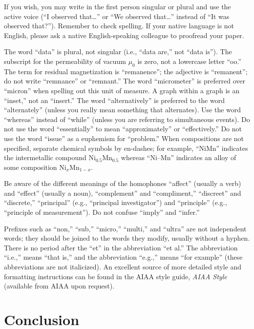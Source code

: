 \documentclass{aiaa-tc}%
\begin{document}
If you wish, you may write in the first person singular or plural and
use the active voice (``I observed that\ldots'' or ``We observed that\ldots''
instead of ``It was observed that?'').
Remember to check spelling.
If your native language is not English, please ask a native
English-speaking colleague to proofread your paper.

The word ``data'' is plural, not singular (i.e., ``data are,'' not ``data
is'').
The subscript for the permeability of vacuum $\mu_0$ is zero, not a
lowercase letter ``oo.''
The term for residual magnetization is ``remanence''; the adjective is
``remanent''; do not write ``remnance'' or ``remnant.''
The word ``micrometer'' is preferred over ``micron'' when spelling out
this unit of measure.
A graph within a graph is an ``inset,'' not an ``insert.''
The word ``alternatively'' is preferred to the word ``alternately''
(unless you really mean something that alternates).
Use the word ``whereas'' instead of ``while'' (unless you are referring
to simultaneous events).
Do not use the word ``essentially'' to mean ``approximately'' or
``effectively.''
Do not use the word ``issue'' as a euphemism for ``problem.''
When compositions are not specified, separate chemical symbols by
en-dashes; for example, ``NiMn'' indicates the intermetallic compound
Ni$_{0.5}$Mn$_{0.5}$ whereas ``Ni--Mn'' indicates an alloy of some
composition Ni$_{x}$Mn$_{1-x}$.

Be aware of the different meanings of the homophones ``affect'' (usually
a verb) and ``effect'' (usually a noun), ``complement'' and
``compliment,'' ``discreet'' and ``discrete,'' ``principal'' (e.g.,
``principal investigator'') and ``principle'' (e.g., ``principle of
measurement''). Do not confuse ``imply'' and ``infer.''

Prefixes such as ``non,'' ``sub,'' ``micro,'' ``multi,'' and ``ultra''
are not independent words; they should be joined to the words they
modify, usually without a hyphen.
There is no period after the ``et'' in the abbreviation ``et al.''
The abbreviation ``i.e.,'' means ``that is,'' and the abbreviation
``e.g.,'' means ``for example'' (these abbreviations are not
italicized).
An excellent source of more detailed style and formatting instructions
can be found in the AIAA style guide, {\it AIAA Style} (available from AIAA
upon request).

\section{Conclusion}
\end{document}

